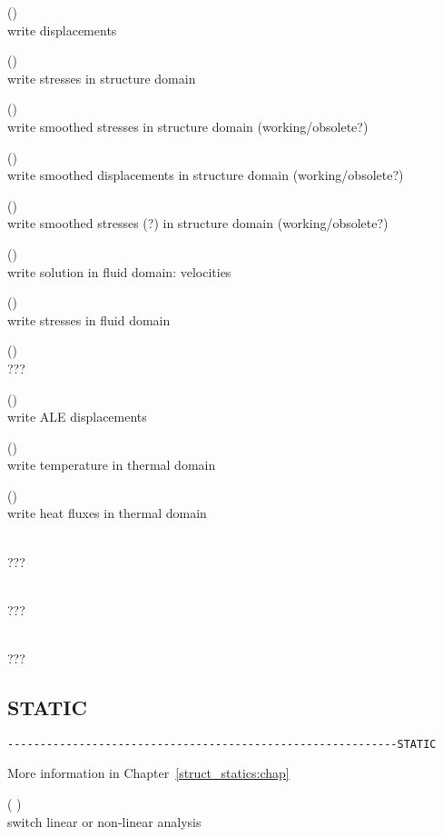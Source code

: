  (\kor{})\\
write displacements

 (\kor{})\\
write stresses in structure domain

 (\kor{})\\
write smoothed stresses in structure domain (working/obsolete?)

 (\kor{})\\
write smoothed displacements in structure domain (working/obsolete?)

 (\kor{})\\
write smoothed stresses (?) in structure domain (working/obsolete?)

 (\kor{})\\
write solution in fluid domain: velocities

 (\kor{})\\
write stresses in fluid domain

 (\kor{})\\
???

 (\kor{})\\
write ALE displacements

 (\kor{})\\
write temperature in thermal domain

 (\kor{})\\
write heat fluxes in thermal domain

\\
???

\\
???

\\
???

\subsection{STATIC}
\begin{verbatim}
------------------------------------------------------------STATIC
\end{verbatim}
More information in Chapter~\ref{struct_statics:chap}

(  \kor {} )\\
switch linear or non-linear analysis

